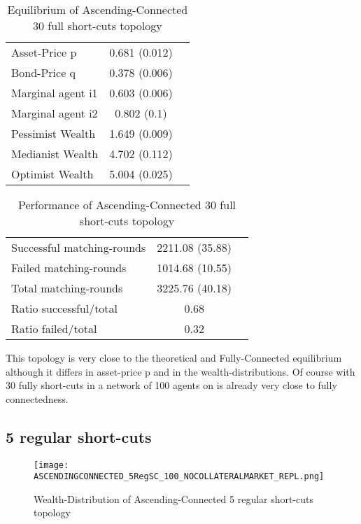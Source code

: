 \documentclass[Bachelorarbeit.tex]{subfiles}
\begin{document}
\begin{table}[H]
	\caption{Equilibrium of Ascending-Connected 30 full short-cuts topology}
	\centering
	\begin{tabular} { l c r }
		\hline
		Asset-Price p & 0.681 (0.012) \\
		Bond-Price q & 0.378 (0.006) \\
		Marginal agent i1 & 0.603 (0.006) \\
		Marginal agent i2 & 0.802 (0.1) \\
		\hline
		Pessimist Wealth & 1.649 (0.009) \\
		Medianist Wealth & 4.702 (0.112) \\
		Optimist Wealth & 5.004 (0.025) \\
		\hline
	\end{tabular}
\end{table} 

\begin{table}[H]
	\caption{Performance of Ascending-Connected 30 full short-cuts topology}
	\centering
	\begin{tabular} { l c r }
		\hline
		Successful matching-rounds& 2211.08 (35.88) \\
		Failed matching-rounds & 1014.68 (10.55) \\
		Total matching-rounds & 3225.76 (40.18) \\
		\hline
		Ratio successful/total & 0.68 \\
		Ratio failed/total & 0.32 \\
		\hline
	\end{tabular}
\end{table}

This topology is very close to the theoretical and Fully-Connected equilibrium although it differs in asset-price p and in the wealth-distributions. Of course with 30 fully short-cuts in a network of 100 agents on is already very close to fully connectedness.

\subsection{5 regular short-cuts}
\begin{figure}[H]
	\centering
  \texttt{[image: ASCENDINGCONNECTED\_5RegSC\_100\_NOCOLLATERALMARKET\_REPL.png]}
	\caption{Wealth-Distribution of Ascending-Connected 5 regular short-cuts topology}
	\label{fig:wealth_ASCENDINGCONNECTED_5RegSC_100_NOCOLLATERALMARKET_REPL}
\end{figure}
\end{document}
